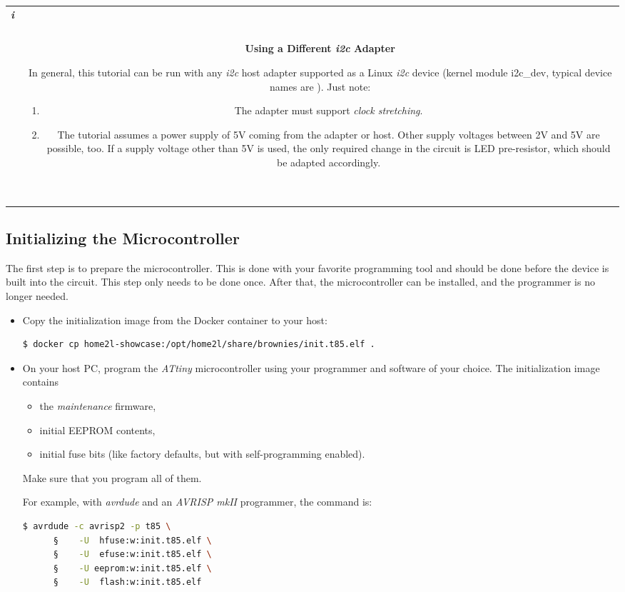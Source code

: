 \documentclass[12pt,english,parskip=half,headheight=19pt]{scrreprt}
\newcommand{\lst}[1]{\colorbox{lstbackground}{\footnotesize\code{#1}}}
\newcommand{\lstf}[1]{\colorbox{lstbackground}{\ttfamily\footnotesize#1}}
\newcommand{\infobox}[1]{
  \par
  \medskip
  \hfill
  \setlength\arrayrulewidth{1pt}
  \begin{tabular}[t]{c|c|}
    \parbox{1.8em}{\hfill\textit{\Huge\textbf{i}\,}}
    &
    \,\parbox{0.89\linewidth}{\setlength{\parskip}{0.5em} \small #1}\,
  \end{tabular}
  \medskip
  \par
}
\begin{document}
\infobox{
  \textbf{Using a Different \textit{i2c} Adapter}

  In general, this tutorial can be run with any \textit{i2c} host adapter supported as a Linux
  \textit{i2c} device (kernel module \lstf{i2c\_dev}, typical device names are \lst{/dev/i2c-*}).
  Just note:
  \begin{enumerate}
    \item The adapter must support \textit{clock stretching}.
    \item The tutorial assumes a power supply of 5V coming from the adapter or host. Other supply voltages
          between 2V and 5V are possible, too. If a supply voltage other than 5V is used, the only
          required change in the circuit is LED pre-resistor, which should be adapted accordingly.
  \end{enumerate}
}



\subsection{Initializing the Microcontroller}
\label{sec:tutorial-brownies-init}

The first step is to prepare the microcontroller. This is done with your favorite programming tool and should be done before the device is built into the circuit. This step only needs to be done once. After that, the microcontroller can be installed, and the programmer is no longer needed.

\begin{itemize}[$\blacktriangleright$]
  \item
    Copy the initialization image from the Docker container to your host:
    \begin{lstlisting}[language=bash]
      $ docker cp home2l-showcase:/opt/home2l/share/brownies/init.t85.elf .
    \end{lstlisting}

  \item
    On your host PC, program the \textit{ATtiny} microcontroller using your programmer and software
    of your choice. The initialization image \lst{init.t85.elf} contains
    \begin{itemize}
      \item the \textit{maintenance} firmware,
      \item initial EEPROM contents,
      \item initial fuse bits (like factory defaults, but with self-programming enabled).
    \end{itemize}
    Make sure that you program all of them.

    For example, with \textit{avrdude} and an \textit{AVRISP mkII} programmer, the command is:
    \begin{lstlisting}[language=bash]
      $ avrdude -c avrisp2 -p t85 \
      §    -U  hfuse:w:init.t85.elf \
      §    -U  efuse:w:init.t85.elf \
      §    -U eeprom:w:init.t85.elf \
      §    -U  flash:w:init.t85.elf
    \end{lstlisting}

\end{itemize}
\end{document}
